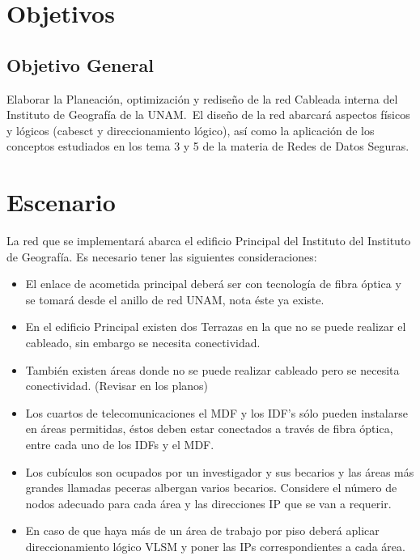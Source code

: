 \documentclass[letterpaper]{article}
\begin{document}
\section{Objetivos}\label{sec:obj}

\subsection{Objetivo General}\label{sec:objgen}

Elaborar la Planeación, optimización y rediseño de la red Cableada interna del
Instituto de Geografía de la UNAM.\ El diseño de la red abarcará aspectos físicos
y lógicos (\gls{cabesct} y direccionamiento lógico), así como la
aplicación de los conceptos estudiados en los tema 3 y 5 de la materia de Redes
de Datos Seguras.

\section{Escenario}\label{sec:esc}

La red que se implementará abarca el edificio Principal del Instituto del Instituto
de Geografía. Es necesario tener las siguientes consideraciones:
\begin{itemize}
\item El enlace de acometida principal deberá ser con tecnología de fibra
  óptica y se tomará desde el anillo de red UNAM, nota éste ya existe.
  
\item  En el edificio Principal existen dos Terrazas en la que no se puede realizar
el cableado, sin embargo se necesita conectividad.

\item También existen áreas donde no se puede realizar cableado pero se
  necesita conectividad. (Revisar en los planos)
  
\item  Los cuartos de telecomunicaciones el MDF y los IDF’s sólo pueden
instalarse en áreas permitidas, éstos deben estar conectados a través de
fibra óptica, entre cada uno de los IDFs y el MDF.\@

\item Los cubículos son ocupados por un investigador y sus becarios y las áreas
más grandes llamadas peceras albergan varios becarios. Considere el
número de nodos adecuado para cada área y las direcciones IP que se
van a requerir.

\item  En caso de que haya más de un área de trabajo por piso deberá aplicar
direccionamiento lógico VLSM y poner las IPs correspondientes a cada
área.
\end{itemize}
\end{document}
